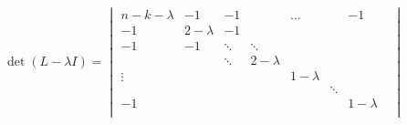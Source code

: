 \documentclass{article}
\begin{document}
\[
\det(L - \lambda I) = 
\begin{vmatrix}
    n-k - \lambda &-1  &-1 &&\dots&&   -1  \\
    -1 & 2 - \lambda & -1&&&&  &    \\
    -1&  -1 & \ddots &\ddots&&&  & \\
    &  &\ddots  & 2 - \lambda &&&&    \\
    \vdots& &  &  &1 - \lambda &&  & \\
    &  &  &  &  &\ddots \\
    -1& &  &  &  & &1 - \lambda \\
\end{vmatrix}
\]
\end{document}
